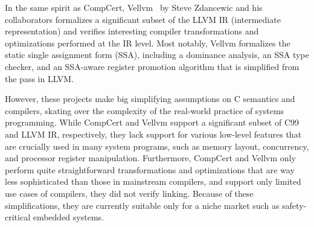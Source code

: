 
In the same spirit as CompCert, Vellvm~\cite{vellvm} by Steve Zdancewic and his collaborators
formalizes a significant subset of the LLVM IR (intermediate representation) and verifies
interesting compiler transformations and optimizations performed at the IR level.  Most notably,
Vellvm formalizes the static single assignment form (SSA), including a dominance analysis, an SSA
type checker, and an SSA-aware register promotion algorithm that is simplified from the
 pass in LLVM.


However, these projects make big simplifying assumptions on C semantics and compilers, skating over
the complexity of the real-world practice of systems programming.  While CompCert and Vellvm support
a significant subset of C99 and LLVM IR, respectively, they lack support for various low-level
features that are crucially used in many system programs, such as memory layout, concurrency, and
processor register manipulation.  Furthermore, CompCert and Vellvm only perform quite
straightforward transformations and optimizations that are way less sophisticated than those in
mainstream compilers, and support only limited use cases of compilers, \eg{} they did not verify
linking.  Because of these simplifications, they are currently suitable only for a niche market such
as safety-critical embedded systems.

